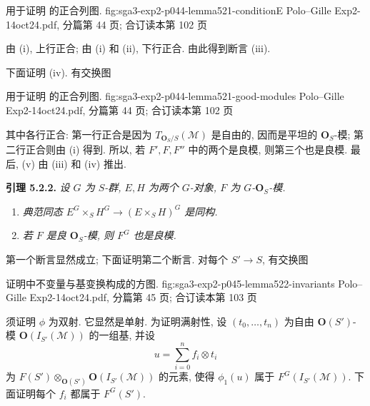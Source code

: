   {用于证明 的正合列图.}
  {fig:sga3-exp2-p044-lemma521-conditionE}
  {Polo--Gille Exp2-14oct24.pdf, 分篇第 44 页;
   合订读本第 102 页}

由 (i), 上行正合; 由 (i) 和 (ii), 下行正合. 由此得到断言 (iii).

下面证明 (iv). 有交换图

  {用于证明 的正合列图.}
  {fig:sga3-exp2-p044-lemma521-good-modules}
  {Polo--Gille Exp2-14oct24.pdf, 分篇第 44 页;
   合订读本第 102 页}

其中各行正合: 第一行正合是因为
\(T_{\mathbf O_S/S}(\mathscr M)\) 是自由的, 因而是平坦的
\(\mathbf O_S\)-模; 第二行正合则由 (i) 得到.
所以, 若 \(F',F,F''\) 中的两个是良模, 则第三个也是良模.
最后, (v) 由 (iii) 和 (iv) 推出.

\medskip
\noindent{}\textbf{引理 5.2.2.}
\textit{设 \(G\) 为 \(S\)-群, \(E,H\) 为两个 \(G\)-对象,
\(F\) 为 \(G\)-\(\mathbf O_S\)-模.}
\begin{enumerate}
\renewcommand{\labelenumi}{(\roman{enumi})}
\item{} \textit{典范同态
\(E^G\times_S H^G\to(E\times_S H)^G\) 是同构.}
\item{} \textit{若 \(F\) 是良 \(\mathbf O_S\)-模, 则
\(F^G\) 也是良模.}
\end{enumerate}

第一个断言显然成立; 下面证明第二个断言. 对每个
\(S'\to S\), 有交换图

  { 证明中不变量与基变换构成的方图.}
  {fig:sga3-exp2-p045-lemma522-invariants}
  {Polo--Gille Exp2-14oct24.pdf, 分篇第 45 页;
   合订读本第 103 页}

须证明 \(\phi\) 为双射. 它显然是单射.
为证明满射性, 设 \((t_0,\ldots,t_n)\) 为自由
\(\mathbf O(S')\)-模 \(\mathbf O(I_{S'}(\mathscr M))\) 的一组基, 并设
\[
 u=\sum_{i=0}^{n}f_i\otimes t_i
\]
为 \(F(S')\otimes_{\mathbf O(S')}\mathbf O(I_{S'}(\mathscr M))\) 的元素,
使得 \(\phi_1(u)\) 属于 \(F^G(I_{S'}(\mathscr M))\).
下面证明每个 \(f_i\) 都属于 \(F^G(S')\).

